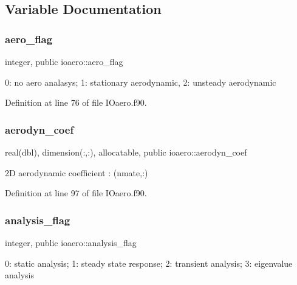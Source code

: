 \subsection{Variable Documentation}
\mbox{\label{namespaceioaero_afb280b6ca8de323c9a07076df81a71e1}} 
\subsubsection{\texorpdfstring{aero\+\_\+flag}{aero\_flag}}
{\footnotesize\ttfamily integer, public ioaero\+::aero\+\_\+flag}



0\+: no aero analasys; 1\+: stationary aerodynamic, 2\+: unsteady aerodynamic 



Definition at line 76 of file I\+Oaero.\+f90.

\mbox{\label{namespaceioaero_a116b30aa43f6d871e7d4a3ed6f4428c3}} 
\subsubsection{\texorpdfstring{aerodyn\+\_\+coef}{aerodyn\_coef}}
{\footnotesize\ttfamily real(dbl), dimension(\+:,\+:), allocatable, public ioaero\+::aerodyn\+\_\+coef}



2D aerodynamic coefficient \+: (nmate,\+:) 



Definition at line 97 of file I\+Oaero.\+f90.

\mbox{\label{namespaceioaero_a435527b09d62e7aac9883e1a6d6f3438}} 
\subsubsection{\texorpdfstring{analysis\+\_\+flag}{analysis\_flag}}
{\footnotesize\ttfamily integer, public ioaero\+::analysis\+\_\+flag}



0\+: static analysis; 1\+: steady state response; 2\+: transient analysis; 3\+: eigenvalue analysis 



